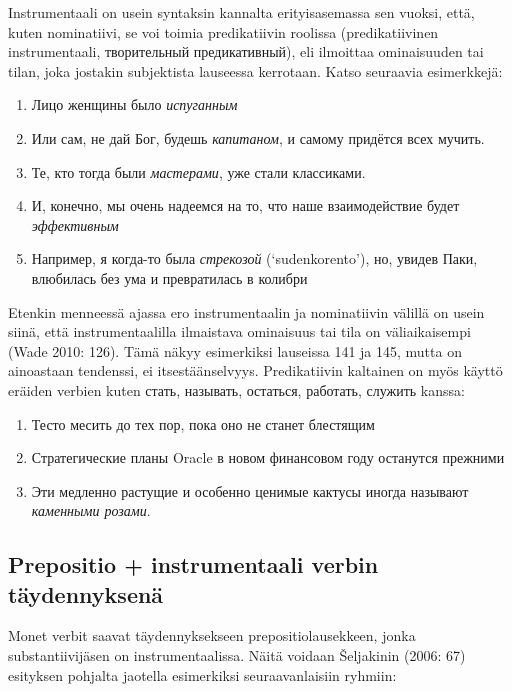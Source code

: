 \documentclass[]{scrreprt}
\providecommand{\tightlist}{%
  \setlength{\itemsep}{0pt}\setlength{\parskip}{0pt}}
\begin{document}
Instrumentaali on usein syntaksin kannalta erityisasemassa sen vuoksi,
että, kuten nominatiivi, se voi toimia predikatiivin roolissa
(predikatiivinen instrumentaali, творительный предикативный), eli
ilmoittaa ominaisuuden tai tilan, joka jostakin subjektista lauseessa
kerrotaan. Katso seuraavia esimerkkejä:

\begin{enumerate}
\def\labelenumi{(\arabic{enumi})}
\setcounter{enumi}{140}
\tightlist
\item
  Лицо женщины было \emph{испуганным}
\item
  Или сам, не дай Бог, будешь \emph{капитаном}, и самому придётся всех
  мучить.
\item
  Те, кто тогда были \emph{мастерами}, уже стали классиками.
\item
  И, конечно, мы очень надеемся на то, что наше взаимодействие будет
  \emph{эффективным}
\item
  Например, я когда-то была \emph{стрекозой} (`sudenkorento'), но,
  увидев Паки, влюбилась без ума и превратилась в колибри
\end{enumerate}

Etenkin menneessä ajassa ero instrumentaalin ja nominatiivin välillä on
usein siinä, että instrumentaalilla ilmaistava ominaisuus tai tila on
väliaikaisempi (Wade 2010: 126). Tämä näkyy esimerkiksi lauseissa 141 ja
145, mutta on ainoastaan tendenssi, ei itsestäänselvyys. Predikatiivin
kaltainen on myös käyttö eräiden verbien kuten стать, называть,
остаться, работать, служить kanssa:

\begin{enumerate}
\def\labelenumi{(\arabic{enumi})}
\setcounter{enumi}{145}
\tightlist
\item
  Тесто месить до тех пор, пока оно не станет блестящим
\item
  Стратегические планы Oracle в новом финансовом году останутся прежними
\item
  Эти медленно растущие и особенно ценимые кактусы иногда называют
  \emph{каменными розами}.
\end{enumerate}

\subsection{Prepositio + instrumentaali verbin
täydennyksenä}\label{prepositio-instrumentaali-verbin-tuxe4ydennyksenuxe4}

Monet verbit saavat täydennyksekseen prepositiolausekkeen, jonka
substantiivijäsen on instrumentaalissa. Näitä voidaan Šeljakinin (2006:
67) esityksen pohjalta jaotella esimerkiksi seuraavanlaisiin ryhmiin:
\end{document}
